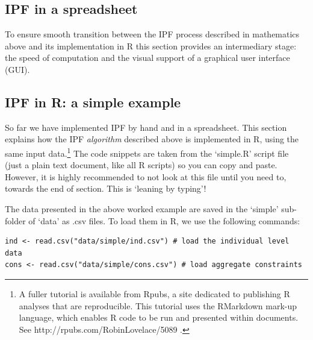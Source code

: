 \documentclass[a4paper, 11pt, twoside]{article}
\begin{document}

\subsection{IPF in a spreadsheet}
To ensure smooth transition between the IPF process
described in mathematics above and its implementation in R this section
provides an intermediary stage: the speed of computation and the visual support
of a graphical user interface (GUI).


\subsection{IPF in R: a simple example} \label{simplementing}
So far we have implemented IPF by hand and in a spreadsheet.
This section explains how the IPF
\emph{algorithm} described above is implemented in R, using the
same input data.\footnote{A fuller tutorial is available from Rpubs, a site dedicated
to publishing R analyses that are reproducible. This tutorial uses the RMarkdown
mark-up language, which enables R code to be run and presented within
documents. See http://rpubs.com/RobinLovelace/5089 \label{fnrpub} .}
The code snippets are taken from the `simple.R' script file (just a plain text
document, like all R scripts) so you can copy and paste. However, it is
highly recommended to not look at this file until you need to, towards
the end of
section. This is `leaning by typing'!

The data presented in the above worked example are saved in the
`simple' sub-folder of `data' as .csv files. To load them in R,
we use the following commands:

\begin{lstlisting}[float=h, caption={Loading the input data in R}, label=cusd]
ind <- read.csv("data/simple/ind.csv") # load the individual level data
cons <- read.csv("data/simple/cons.csv") # load aggregate constraints
\end{lstlisting}
\end{document}
